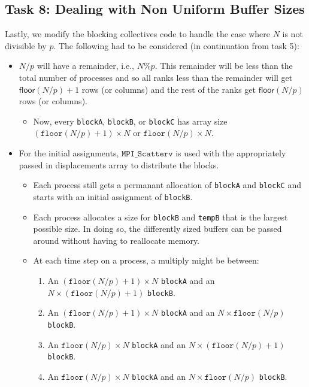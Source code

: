 \documentclass{article}
\begin{document}
\subsection*{Task 8: Dealing with Non Uniform Buffer Sizes}
Lastly, we modify the blocking collectives code to handle the case where $N$ 
is not divisible by $p$. The following had to be considered (in continuation from task 5):
\begin{itemize}
    \item $N/p$ will have a remainder, i.e., $N \% p$. This remainder 
    will be less than the total number of processes and so all ranks less than 
    the remainder will get $\mathsf{floor}(N/p) + 1$ rows (or columns) and the 
    rest of the ranks get $\mathsf{floor}(N/p)$ rows (or columns).
    \begin{itemize}
        \item Now, every \texttt{blockA}, \texttt{blockB}, or \texttt{blockC} has 
        array size $(\texttt{floor}(N/p) + 1) \times N$ or $\texttt{floor}(N/p) \times N$. 
    \end{itemize}
    \item For the initial assignments, $\texttt{MPI\_Scatterv}$ is used with the appropriately passed 
    in displacements array to distribute the blocks.
    \begin{itemize}
        \item Each process still gets a permanant allocation of \texttt{blockA} and \texttt{blockC} and 
        starts with an initial assignment of \texttt{blockB}.
        \item Each process allocates a size for \texttt{blockB} and \texttt{tempB} that is the largest possible size.
        In doing so, the differently sized buffers can be passed around without having to reallocate memory.
        \item At each time step on a process, a multiply might be between:
        \begin{enumerate}
            \item An $(\texttt{floor}(N/p) + 1) \times N$ \texttt{blockA} and an $N \times (\texttt{floor}(N/p) + 1)$ \texttt{blockB}.
            \item An $(\texttt{floor}(N/p) + 1) \times N$ \texttt{blockA} and an $N \times \texttt{floor}(N/p)$ \texttt{blockB}.
            \item An $\texttt{floor}(N/p) \times N$ \texttt{blockA} and an $N \times (\texttt{floor}(N/p) + 1)$ \texttt{blockB}.
            \item An $\texttt{floor}(N/p) \times N$ \texttt{blockA} and an $N \times \texttt{floor}(N/p)$ \texttt{blockB}.

\end{enumerate}
\end{itemize}
\end{itemize}
\end{document}
